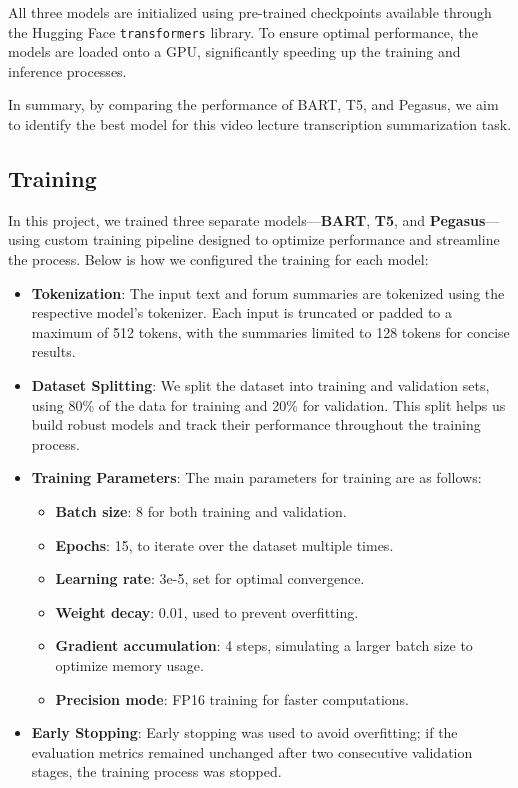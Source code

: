 \documentclass[conference]{IEEEtran}
\begin{document}
All three models are initialized using pre-trained checkpoints available through the Hugging Face \texttt{transformers} library. To ensure optimal performance, the models are loaded onto a GPU, significantly speeding up the training and inference processes.

In summary, by comparing the performance of BART, T5, and Pegasus, we aim to identify the best model for this video lecture transcription summarization task.


\subsection{Training}

In this project, we trained three separate models—\textbf{BART}, \textbf{T5}, and \textbf{Pegasus}—using custom training pipeline designed to optimize performance and streamline the process. Below is how we configured the training for each model:

\begin{itemize}
    \item \textbf{Tokenization}: The input text and forum summaries are tokenized using the respective model's tokenizer. Each input is truncated or padded to a maximum of 512 tokens, with the summaries limited to 128 tokens for concise results.
    \item \textbf{Dataset Splitting}: We split the dataset into training and validation sets, using 80\% of the data for training and 20\% for validation. This split helps us build robust models and track their performance throughout the training process.
\end{itemize}

\begin{itemize}
    \item \textbf{Training Parameters}: The main parameters for training are as follows:
    \begin{itemize}
        \item \textbf{Batch size}: 8 for both training and validation.
        \item \textbf{Epochs}: 15, to iterate over the dataset multiple times.
        \item \textbf{Learning rate}: 3e-5, set for optimal convergence.
        \item \textbf{Weight decay}: 0.01, used to prevent overfitting.
        \item \textbf{Gradient accumulation}: 4 steps, simulating a larger batch size to optimize memory usage.
        \item \textbf{Precision mode}: FP16 training for faster computations.
    \end{itemize}
    \item \textbf{Early Stopping}: Early stopping was used to avoid overfitting; if the evaluation metrics remained unchanged after two consecutive validation stages, the training process was stopped.
\end{itemize}
\end{document}
